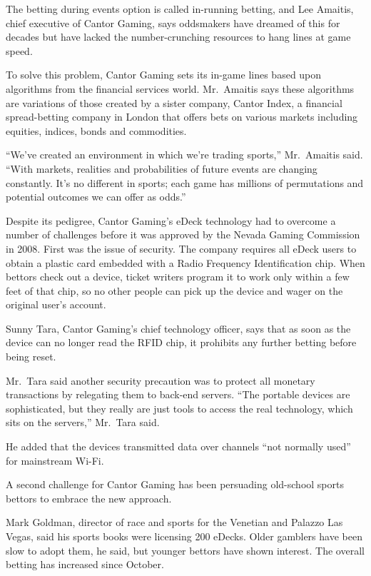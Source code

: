 ﻿\documentclass[12pt]{article}
\begin{document}
The betting during events option is called in-running betting, and Lee Amaitis, chief executive of
Cantor Gaming, says oddsmakers have dreamed of this for decades but have lacked the number-crunching
resources to hang lines at game speed.

To solve this problem, Cantor Gaming sets its in-game lines based upon algorithms from the financial
services world. Mr.~Amaitis says these algorithms are variations of those created by a sister
company, Cantor Index, a financial spread-betting company in London that offers bets on various
markets including equities, indices, bonds and commodities.

``We've created an environment in which we're trading sports,'' Mr.~Amaitis said. ``With markets,
realities and probabilities of future events are changing constantly. It's no different in sports;
each game has millions of permutations and potential outcomes we can offer as odds.''

Despite its pedigree, Cantor Gaming's eDeck technology had to overcome a number of challenges before
it was approved by the Nevada Gaming Commission in 2008. First was the issue of security. The
company requires all eDeck users to obtain a plastic card embedded with a Radio Frequency
Identification chip. When bettors check out a device, ticket writers program it to work only within
a few feet of that chip, so no other people can pick up the device and wager on the original user's
account.

Sunny Tara, Cantor Gaming's chief technology officer, says that as soon as the device can no longer
read the RFID chip, it prohibits any further betting before being reset.

Mr.~Tara said another security precaution was to protect all monetary transactions by relegating
them to back-end servers. ``The portable devices are sophisticated, but they really are just tools
to access the real technology, which sits on the servers,'' Mr.~Tara said.

He added that the devices transmitted data over channels ``not normally used'' for mainstream Wi-Fi.

A second challenge for Cantor Gaming has been persuading old-school sports bettors to embrace the
new approach.

Mark Goldman, director of race and sports for the Venetian and Palazzo Las Vegas, said his sports
books were licensing 200 eDecks. Older gamblers have been slow to adopt them, he said, but younger
bettors have shown interest. The overall betting has increased since October.
\end{document}
